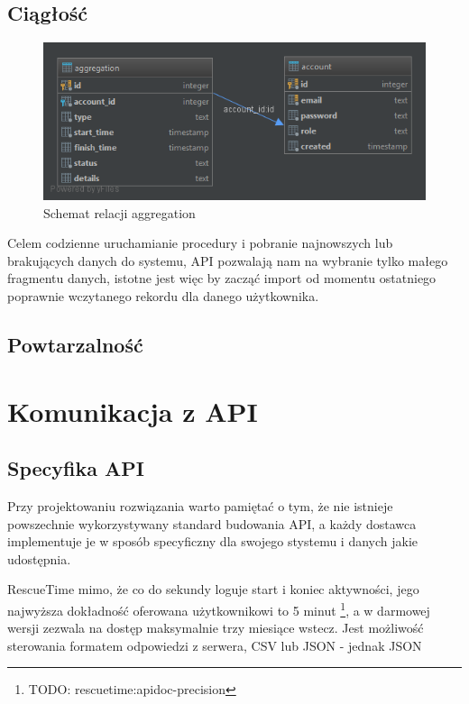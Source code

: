 \documentclass[brudnopis]{xmgr}
\begin{document}

        \subsection*{Ciągłość}

            \begin{figure}
                \includegraphics[width=\linewidth]{fig/db-aggregation.png}
                \caption{Schemat relacji aggregation}
                \label{fig:Relacja aggregation}
            \end{figure}
            Celem codzienne uruchamianie procedury i pobranie najnowszych lub brakujących danych do systemu,
            API pozwalają nam na wybranie tylko małego fragmentu danych, istotne jest więc by zacząć import
            od momentu ostatniego poprawnie wczytanego rekordu dla danego użytkownika.

        \subsection*{Powtarzalność}

    \section{Komunikacja z API}

        \subsection*{Specyfika API}
            Przy projektowaniu rozwiązania warto pamiętać o tym, że nie istnieje powszechnie wykorzystywany standard budowania API,
            a każdy dostawca implementuje je w sposób specyficzny dla swojego stystemu i danych jakie udostępnia.

            RescueTime mimo, że co do sekundy loguje start i koniec aktywności,
            jego najwyższa dokładność oferowana użytkownikowi to 5 minut \footnote{TODO: rescuetime:apidoc-precision},
            a w darmowej wersji zezwala na dostęp maksymalnie trzy miesiące wstecz.
            Jest możliwość sterowania formatem odpowiedzi z serwera, CSV lub JSON - jednak JSON	
\end{document}
